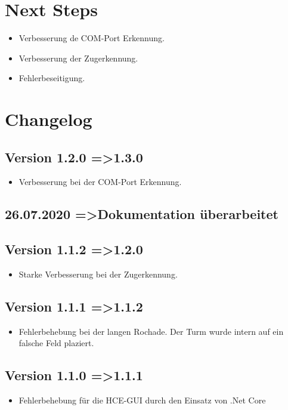 \documentclass[11pt,a4paper]{article}
\begin{document}
\section{Next Steps}
\begin{itemize}
	\item Verbesserung de COM-Port Erkennung.
	\item Verbesserung der Zugerkennung.
	\item Fehlerbeseitigung.
\end{itemize}

\pagebreak

\section{Changelog}
\subsection{Version 1.2.0 =\textgreater 1.3.0}
\begin{itemize}
	\item Verbesserung bei der COM-Port Erkennung.
\end{itemize}

\subsection{26.07.2020 =\textgreater Dokumentation überarbeitet}
\subsection{Version 1.1.2 =\textgreater 1.2.0}
\begin{itemize}
	\item Starke Verbesserung bei der Zugerkennung.
\end{itemize}
\subsection{Version 1.1.1 =\textgreater 1.1.2}
\begin{itemize}
	\item Fehlerbehebung bei der langen Rochade. Der Turm wurde intern auf ein falsche Feld plaziert.
\end{itemize}
\subsection{Version 1.1.0 =\textgreater 1.1.1}
\begin{itemize}
	\item Fehlerbehebung für die HCE-GUI durch den Einsatz von .Net Core
\end{itemize}
\end{document}
